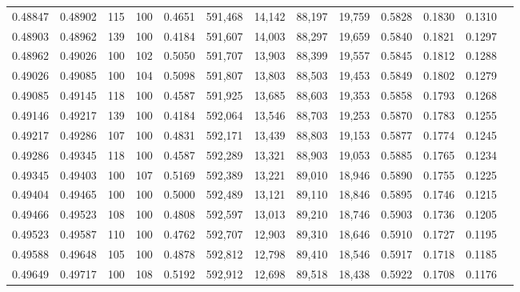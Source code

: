 \begin{tabular}{rrrrrrrrrrrrr}
0.48847 & 0.48902 &   115 & 100 &                                     0.4651 & 591,468 &  14,142 &  88,197 &  19,759 & 0.5828 & 0.1830 & 0.1310 \\
0.48903 & 0.48962 &   139 & 100 &                                     0.4184 & 591,607 &  14,003 &  88,297 &  19,659 & 0.5840 & 0.1821 & 0.1297 \\
0.48962 & 0.49026 &   100 & 102 &                                     0.5050 & 591,707 &  13,903 &  88,399 &  19,557 & 0.5845 & 0.1812 & 0.1288 \\
0.49026 & 0.49085 &   100 & 104 &                                     0.5098 & 591,807 &  13,803 &  88,503 &  19,453 & 0.5849 & 0.1802 & 0.1279 \\
0.49085 & 0.49145 &   118 & 100 &                                     0.4587 & 591,925 &  13,685 &  88,603 &  19,353 & 0.5858 & 0.1793 & 0.1268 \\
0.49146 & 0.49217 &   139 & 100 &                                     0.4184 & 592,064 &  13,546 &  88,703 &  19,253 & 0.5870 & 0.1783 & 0.1255 \\
0.49217 & 0.49286 &   107 & 100 &                                     0.4831 & 592,171 &  13,439 &  88,803 &  19,153 & 0.5877 & 0.1774 & 0.1245 \\
0.49286 & 0.49345 &   118 & 100 &                                     0.4587 & 592,289 &  13,321 &  88,903 &  19,053 & 0.5885 & 0.1765 & 0.1234 \\
0.49345 & 0.49403 &   100 & 107 &                                     0.5169 & 592,389 &  13,221 &  89,010 &  18,946 & 0.5890 & 0.1755 & 0.1225 \\
0.49404 & 0.49465 &   100 & 100 &                                     0.5000 & 592,489 &  13,121 &  89,110 &  18,846 & 0.5895 & 0.1746 & 0.1215 \\
0.49466 & 0.49523 &   108 & 100 &                                     0.4808 & 592,597 &  13,013 &  89,210 &  18,746 & 0.5903 & 0.1736 & 0.1205 \\
0.49523 & 0.49587 &   110 & 100 &                                     0.4762 & 592,707 &  12,903 &  89,310 &  18,646 & 0.5910 & 0.1727 & 0.1195 \\
0.49588 & 0.49648 &   105 & 100 &                                     0.4878 & 592,812 &  12,798 &  89,410 &  18,546 & 0.5917 & 0.1718 & 0.1185 \\
0.49649 & 0.49717 &   100 & 108 &                                     0.5192 & 592,912 &  12,698 &  89,518 &  18,438 & 0.5922 & 0.1708 & 0.1176 \\

\end{tabular}
